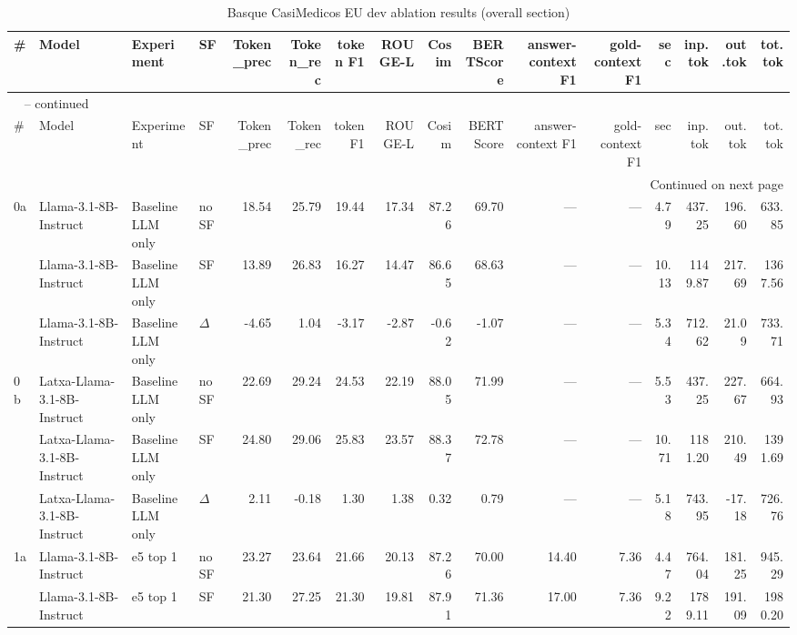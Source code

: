 \begin{landscape}
\begin{footnotesize}
\setlength{\LTcapwidth}{\linewidth}
\begin{longtable}{l l l l r r r r r r r r r r r r}
\caption{Basque CasiMedicos EU dev ablation results (overall section)} \label{tab:eu-casi} \\
\toprule
\# & Model & Experiment & SF & Token\_prec & Token\_rec & token F1 & ROUGE-L & Cosim & BERTScore & answer-context F1 & gold-context F1 & sec & inp.tok & out.tok & tot.tok \\
\midrule
\endfirsthead
\multicolumn{16}{l}{\tablename\ \thetable{} -- continued} \\
\toprule
\# & Model & Experiment & SF & Token\_prec & Token\_rec & token F1 & ROUGE-L & Cosim & BERTScore & answer-context F1 & gold-context F1 & sec & inp.tok & out.tok & tot.tok \\
\midrule
\endhead
\midrule
\multicolumn{16}{r}{Continued on next page} \\
\endfoot
\bottomrule
\endlastfoot
0a & Llama-3.1-8B-Instruct & Baseline LLM only & noSF & 18.54 & 25.79 & 19.44 & 17.34 & 87.26 & 69.70 & --- & --- & 4.79 & 437.25 & 196.60 & 633.85 \\
 & Llama-3.1-8B-Instruct & Baseline LLM only & SF & 13.89 & 26.83 & 16.27 & 14.47 & 86.65 & 68.63 & --- & --- & 10.13 & 1149.87 & 217.69 & 1367.56 \\
 & Llama-3.1-8B-Instruct & Baseline LLM only & $\Delta$ & -4.65 & 1.04 & -3.17 & -2.87 & -0.62 & -1.07 & --- & --- & 5.34 & 712.62 & 21.09 & 733.71 \\
0b & Latxa-Llama-3.1-8B-Instruct & Baseline LLM only & noSF & 22.69 & 29.24 & 24.53 & 22.19 & 88.05 & 71.99 & --- & --- & 5.53 & 437.25 & 227.67 & 664.93 \\
 & Latxa-Llama-3.1-8B-Instruct & Baseline LLM only & SF & 24.80 & 29.06 & 25.83 & 23.57 & 88.37 & 72.78 & --- & --- & 10.71 & 1181.20 & 210.49 & 1391.69 \\
 & Latxa-Llama-3.1-8B-Instruct & Baseline LLM only & $\Delta$ & 2.11 & -0.18 & 1.30 & 1.38 & 0.32 & 0.79 & --- & --- & 5.18 & 743.95 & -17.18 & 726.76 \\
\midrule
1a & Llama-3.1-8B-Instruct & e5 top 1 & noSF & 23.27 & 23.64 & 21.66 & 20.13 & 87.26 & 70.00 & 14.40 & 7.36 & 4.47 & 764.04 & 181.25 & 945.29 \\
 & Llama-3.1-8B-Instruct & e5 top 1 & SF & 21.30 & 27.25 & 21.30 & 19.81 & 87.91 & 71.36 & 17.00 & 7.36 & 9.22 & 1789.11 & 191.09 & 1980.20 \\

\end{longtable}
\end{footnotesize}
\end{landscape}
